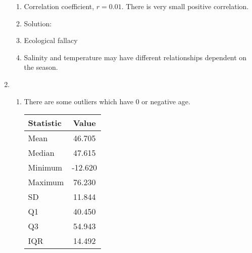 \documentclass[12pt, a4paper]{article}
\begin{document}
\begin{enumerate}[Q\arabic*.]
\begin{enumerate}[(\alph*.)]
    \item Correlation coefficient, $r = 0.01$. There is very small positive correlation.
      \begin{center}
      \end{center}

    \item Solution:\\
      \begin{center}
      \end{center}

    \item Ecological fallacy

    \item Salinity and temperature may have different relationships dependent on the season.
    \end{enumerate}

  \pagebreak
  \item 
    \begin{enumerate}[(\alph*.)]
      \item There are some outliers which have 0 or negative age. 
        \begin{center}
            \begin{tabular}{|l|c|}
                \hline
                \textbf{Statistic} & \textbf{Value} \\ 
                \hline
                Mean      & 46.705 \\ 
                \hline
                Median    & 47.615 \\ 
                \hline
                Minimum   & -12.620 \\ 
                \hline
                Maximum   & 76.230 \\ 
                \hline
                SD & 11.844 \\ 
                \hline
                Q1 & 40.450 \\ 
                \hline
                Q3 & 54.943 \\ 
                \hline
                IQR & 14.492 \\ 
                \hline
            \end{tabular}
        \end{center}
      \begin{minipage}[t]{.4\textwidth}
      \end{minipage}%
      \begin{minipage}[t]{.4\textwidth}
      \end{minipage}%


\end{enumerate}
\end{enumerate}
\end{document}
